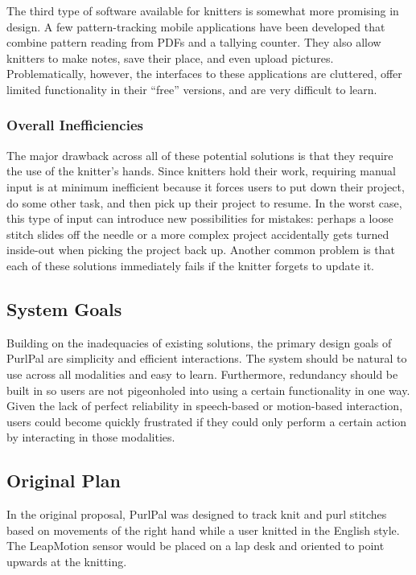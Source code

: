 \documentclass[11pt,twocolumn]{article}
\begin{document}
The third type of software available for knitters is somewhat more promising in design.
A few pattern-tracking mobile applications have been developed that combine pattern reading from PDFs and a tallying counter.
They also allow knitters to make notes, save their place, and even upload pictures.
Problematically, however, the interfaces to these applications are cluttered, offer limited functionality in their ``free'' versions, and are very difficult to learn.

\subsubsection{Overall Inefficiencies}

The major drawback across all of these potential solutions is that they require the use of the knitter's hands.
Since knitters hold their work, requiring manual input is at minimum inefficient because it forces users to put down their project, do some other task, and then pick up their project to resume.
In the worst case, this type of input can introduce new possibilities for mistakes: perhaps a loose stitch slides off the needle or a more complex project accidentally gets turned inside-out when picking the project back up.
Another common problem is that each of these solutions immediately fails if the knitter forgets to update it.

\subsection{System Goals} \label{goals}

Building on the inadequacies of existing solutions, the primary design goals of PurlPal are simplicity and efficient interactions.
The system should be natural to use across all modalities and easy to learn.
Furthermore, redundancy should be built in so users are not pigeonholed into using a certain functionality in one way.
Given the lack of perfect reliability in speech-based or motion-based interaction, users could become quickly frustrated if they could only perform a certain action by interacting in those modalities.

\subsection{Original Plan} \label{plan}

In the original proposal, PurlPal was designed to track knit and purl stitches based on movements of the right hand while a user knitted in the English style.
The LeapMotion sensor would be placed on a lap desk and oriented to point upwards at the knitting.
\end{document}
